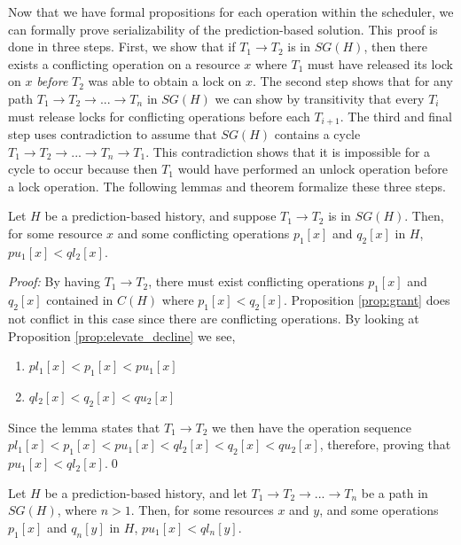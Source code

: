 Now that we have formal propositions for each operation within the scheduler, we can formally prove serializability of the prediction-based solution. This proof is done in three steps. First, we show that if $T_{1} \rightarrow T_{2}$ is in $SG(H)$, then there exists a conflicting operation on a resource $x$ where $T_{1}$ must have released its lock on $x$ \textit{before} $T_{2}$ was able to obtain a lock on $x$. The second step shows that for any path $T_{1} \rightarrow T_{2} \rightarrow ... \rightarrow T_{n}$ in $SG(H)$ we can show by transitivity that every $T_{i}$ must release locks for conflicting operations before each $T_{i+1}$. The third and final step uses contradiction to assume that $SG(H)$ contains a cycle $T_{1} \rightarrow T_{2} \rightarrow ... \rightarrow T_{n} \rightarrow T_{1}$. This contradiction shows that it is impossible for a cycle to occur because then $T_{1}$ would have performed an unlock operation before a lock operation. The following lemmas and theorem formalize these three steps.

\begin{lemma}
\label{lemma1}
Let $H$ be a prediction-based history, and suppose $T_{1} \rightarrow T_{2}$ is in $SG(H)$. Then, for some resource $x$ and some conflicting operations $p_{1}[x]$ and $q_{2}[x]$ in $H$, $pu_{1}[x] < ql_{2}[x]$.
\end{lemma}

\textit{Proof:} By having $T_{1} \rightarrow T_{2}$, there must exist conflicting operations $p_{1}[x]$ and $q_{2}[x]$ contained in $C(H)$ where $p_{1}[x] < q_{2}[x]$. Proposition \ref{prop:grant} does not conflict in this case since there are conflicting operations. By looking at Proposition \ref{prop:elevate_decline} we see,

\begin{enumerate}
  \item $pl_{1}[x] < p_{1}[x] < pu_{1}[x]$
  \item $ql_{2}[x] < q_{2}[x] < qu_{2}[x]$
\end{enumerate}

Since the lemma states that $T_{1} \rightarrow T_{2}$ we then have the operation sequence $pl_{1}[x] < p_{1}[x] < pu_{1}[x] < ql_{2}[x] < q_{2}[x] < qu_{2}[x]$, therefore, proving that $pu_{1}[x] < ql_{2}[x]$.\qed

\begin{lemma}
\label{lemma2}
Let $H$ be a prediction-based history, and let $T_{1} \rightarrow T_{2} \rightarrow ... \rightarrow T_{n}$ be a path in $SG(H)$, where $n > 1$. Then, for some resources $x$ and $y$, and some operations $p_{1}[x]$ and $q_{n}[y]$ in $H$, $pu_{1}[x] < ql_{n}[y]$.
\end{lemma}

